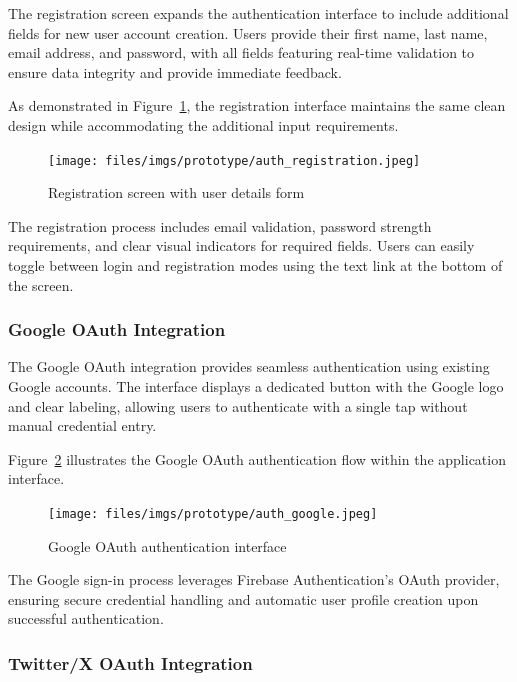 The registration screen expands the authentication interface to include additional fields for new user account creation. Users provide their first name, last name, email address, and password, with all fields featuring real-time validation to ensure data integrity and provide immediate feedback.

As demonstrated in Figure~\ref{fig:registration-screen}, the registration interface maintains the same clean design while accommodating the additional input requirements.

 \begin{figure}[H]
 \centering
 \texttt{[image: files/imgs/prototype/auth\_registration.jpeg]}
 \caption{Registration screen with user details form}
 \label{fig:registration-screen}
 \end{figure}

The registration process includes email validation, password strength requirements, and clear visual indicators for required fields. Users can easily toggle between login and registration modes using the text link at the bottom of the screen.

\subsubsection{Google OAuth Integration}

The Google OAuth integration provides seamless authentication using existing Google accounts. The interface displays a dedicated button with the Google logo and clear labeling, allowing users to authenticate with a single tap without manual credential entry.

Figure~\ref{fig:google-oauth} illustrates the Google OAuth authentication flow within the application interface.

 \begin{figure}[H]
 \centering
 \texttt{[image: files/imgs/prototype/auth\_google.jpeg]}
 \caption{Google OAuth authentication interface}
 \label{fig:google-oauth}
 \end{figure}

The Google sign-in process leverages Firebase Authentication's OAuth provider, ensuring secure credential handling and automatic user profile creation upon successful authentication.

\subsubsection{Twitter/X OAuth Integration}

